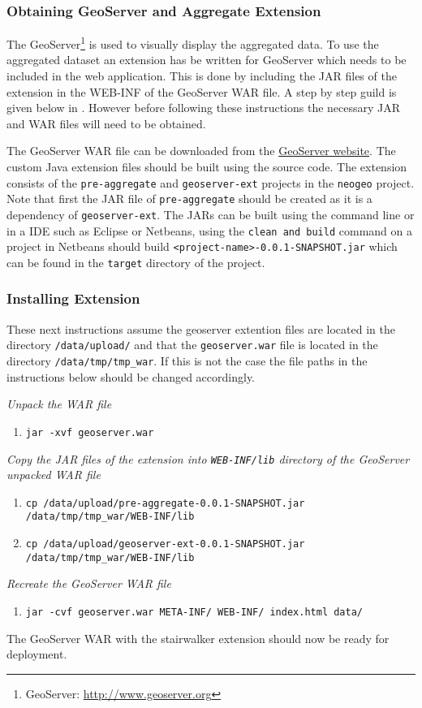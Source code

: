 \subsubsection{Obtaining GeoServer and Aggregate Extension}
The GeoServer\footnote{GeoServer: \url{http://www.geoserver.org}} is used to visually display the aggregated data. To use the aggregated dataset an extension has be written for GeoServer which needs to be included in the web application. This is done by including the JAR files of the extension in the WEB-INF of the GeoServer WAR file. A step by step guild is given below in . However before following these instructions the necessary JAR and WAR files will need to be obtained.

The GeoServer WAR file can be downloaded from the \href{http://www.geoserver.org/download/}{GeoServer website}. The custom Java extension files should be built using the source code. The extension consists of the \lstinline|pre-aggregate| and \lstinline|geoserver-ext| projects in the \lstinline|neogeo| project. Note that first the JAR file of \lstinline|pre-aggregate| should be created as it is a dependency of \lstinline|geoserver-ext|. The JARs can be built using the command line or in a IDE such as Eclipse or Netbeans, using the \lstinline|clean and build| command on a project in Netbeans should build \lstinline|<project-name>-0.0.1-SNAPSHOT.jar| which can be found in the \lstinline|target| directory of the project.

\subsubsection{Installing Extension}
\label{sec:InstallExtension}
\noindent These next instructions assume the geoserver extention files are located in the directory \lstinline|/data/upload/| and that the \lstinline|geoserver.war| file is located in the directory \mbox{\lstinline|/data/tmp/tmp_war|}. If this is not the case the file paths in the instructions below should be changed accordingly. \newline

\noindent \textit{Unpack the WAR file}
\begin{enumerate}
	\item \lstinline|jar -xvf geoserver.war|
\end{enumerate}
\textit{Copy the JAR files of the extension into \lstinline|WEB-INF/lib| directory of the GeoServer unpacked WAR file}
\begin{enumerate}[resume]
	\item \lstinline|cp /data/upload/pre-aggregate-0.0.1-SNAPSHOT.jar /data/tmp/tmp_war/WEB-INF/lib|
	\item \lstinline|cp /data/upload/geoserver-ext-0.0.1-SNAPSHOT.jar /data/tmp/tmp_war/WEB-INF/lib|
\end{enumerate}
\textit{Recreate the GeoServer WAR file}
\begin{enumerate}[resume]
	\item \lstinline|jar -cvf geoserver.war META-INF/ WEB-INF/ index.html data/|
\end{enumerate}
The GeoServer WAR with the stairwalker extension should now be ready for deployment.

